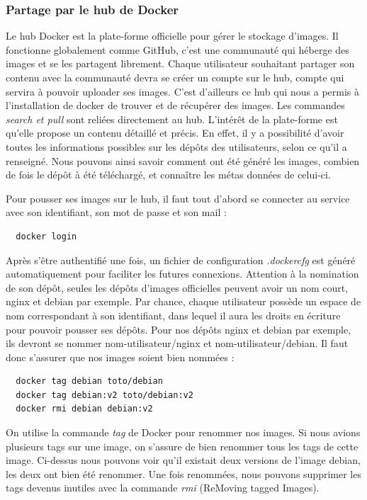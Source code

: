 \documentclass[12pt,a4paper]{article}
\begin{document}
\subsubsection{Partage par le hub de Docker}

Le hub Docker est la plate-forme officielle pour gérer le stockage d'images. Il fonctionne globalement comme GitHub, c'est une communauté qui héberge des images et se les partagent librement. Chaque utilisateur souhaitant partager son contenu avec la communauté devra se créer un compte sur le hub, compte qui servira à pouvoir uploader ses images. C'est d'ailleurs ce hub qui nous a permis à l'installation de docker de trouver et de récupérer des images. Les commandes \textit{search et pull} sont reliées directement au hub. L'intérêt de la plate-forme est qu'elle propose un contenu détaillé et précis. En effet, il y a possibilité d'avoir toutes les informations possibles sur les dépôts des utilisateurs, selon ce qu'il a renseigné. Nous pouvons ainsi savoir comment ont été généré les images, combien de fois le dépôt à été téléchargé, et connaître les métas données de celui-ci.

Pour pousser ses images sur le hub, il faut tout d'abord se connecter au service avec son identifiant, son mot de passe et son mail :
\begin{lstlisting}
  docker login
\end{lstlisting}
Après s'être authentifié une fois, un fichier de configuration \textit{.dockercfg} est généré automatiquement pour faciliter les futures connexions. Attention à la nomination de son dépôt, seules les dépôts d'images officielles peuvent avoir un nom court, nginx et debian par exemple. Par chance, chaque utilisateur possède un espace de nom correspondant à son identifiant, dans lequel il aura les droits en écriture pour pouvoir pousser ses dépôts. Pour nos dépôts nginx et debian par exemple, ils devront se nommer nom-utilisateur/nginx et nom-utilisateur/debian. Il faut donc s'assurer que nos images soient bien nommées :

\begin{lstlisting}
  docker tag debian toto/debian
  docker tag debian:v2 toto/debian:v2
  docker rmi debian debian:v2
\end{lstlisting}

On utilise la commande \textit{tag} de Docker pour renommer nos images. Si nous avions plusieurs tags sur une image, on s'assure de bien renommer tous les tags de cette image. Ci-dessus nous pouvons voir qu'il existait deux versions de l'image debian, les deux ont bien été renommer. Une fois renommées, nous pouvons supprimer les tags devenus inutiles avec la commande \textit{rmi} (ReMoving tagged Images).
\end{document}
